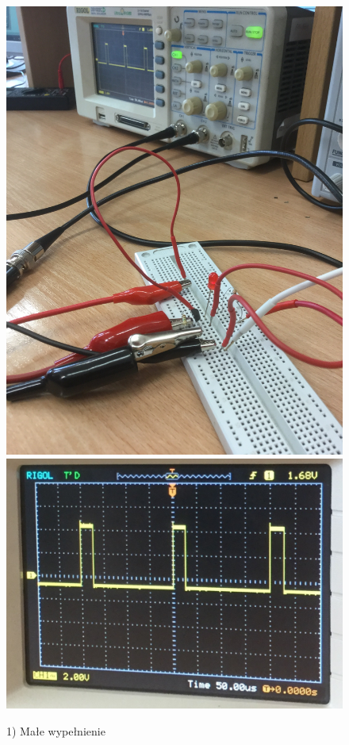 \documentclass[polish,a4paper]{article}
\begin{document}
\begin{figure}
\caption{1) Małe wypełnienie}
\includegraphics[scale=0.05]{male}
\includegraphics[scale=0.25]{maleOsc}


\end{figure}
\end{document}
